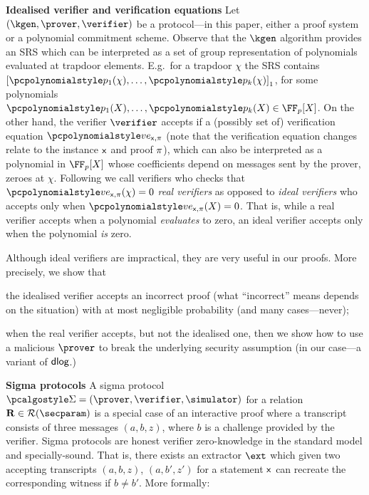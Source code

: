 \documentclass[runningheads,11pt]{llncs}
\newcommand{\oursubsub}[1] {\smallskip\noindent\textbf{#1}}
\begin{document}
\oursubsub{Idealised verifier and verification equations} Let
$(\kgen, \prover, \verifier)$ be a protocol---in this paper, either a proof
system or a polynomial commitment scheme. Observe that the $\kgen$ algorithm
provides an SRS which can be interpreted as a set of group representation of
polynomials evaluated at trapdoor elements. E.g.~for a trapdoor $\chi$ the SRS
contains $\gone{\p{p_1}(\chi), \ldots, \p{p_k}(\chi)}$, for some polynomials
$\p{p_1}(X), \ldots, \p{p_k}(X) \in \FF_p[X]$. On the other hand, the verifier
$\verifier$ accepts if a (possibly set of) verification equation
$\vereq_{\inp, \zkproof}$ (note that the verification equation changes relate to
the instance $\mathsf{x}$ and proof $\pi$), which can also be interpreted as a
polynomial in $\FF_p[X]$ whose coefficients depend on messages sent by the
prover, zeroes at $\chi$. Following \cite{EPRINT:GabWilCio19} we call verifiers
who checks that $\vereq_{\inp, \zkproof}(\chi) = 0$ \emph{real verifiers} as opposed to
\emph{ideal verifiers} who accepts only when $\vereq_{\inp, \zkproof}(X) = 0$. That is, while a
real verifier accepts when a polynomial \emph{evaluates} to zero, an ideal
verifier accepts only when the polynomial \emph{is} zero.

Although ideal verifiers are impractical, they are very useful in our
proofs. More precisely, we show that
\begin{compactenum}
\item the idealised verifier accepts an incorrect proof (what ``incorrect''
  means depends on the situation) with at most negligible probability (and many
  cases---never);
\item when the real verifier accepts, but not the idealised one, then we show
  how to use a malicious $\prover$ to break the underlying security assumption
  (in our case---a variant of $\mathsf{dlog}$.)
\end{compactenum}

\oursubsub{Sigma protocols}
A sigma protocol $\sigmaprot = (\prover, \verifier, \simulator)$ for a relation
$\REL \in \RELGEN(\secparam)$ is a special case of an interactive proof where a
transcript consists of three messages $(a, b, z)$, where $b$ is a challenge
provided by the verifier. Sigma protocols are honest verifier zero-knowledge in
the standard model and specially-sound. That is, there exists an extractor
$\ext$ which given two accepting transcripts $(a, b, z)$, $(a, b', z')$ for a
statement $\mathsf{x}$ can recreate the corresponding witness if $b \neq b'$.
More formally:
\end{document}
